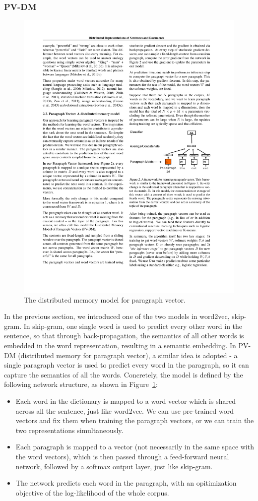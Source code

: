 \subsubsection{PV-DM}

\begin{figure}
\centering
\includegraphics[width=0.5\columnwidth]{figures/methods/PV-DM}
\caption{The distributed memory model for paragraph vector.}
\label{fig:methods:PV-DM}
\end{figure}

In the previous section, we introduced one of the two models in word2vec, skip-gram. In skip-gram, one single word is used to predict every other word in the sentence, so that through back-propagation, the semantics of all other words is embedded in the word representation, resulting in a semantic embedding. In PV-DM (distributed memory for paragraph vector), a similar idea is adopted - a single paragraph vector is used to predict every word in the paragraph, so it can capture the semantics of all the words. Concretely, the model is defined by the following network structure, as shown in Figure~\ref{fig:methods:PV-DM}:

\begin{itemize}
    \item Each word in the dictionary is mapped to a word vector which is shared across all the sentence, just like word2vec. We can use pre-trained word vectors and fix them when training the paragraph vectors, or we can train the two representations simultaneously.
    \item Each paragraph is mapped to a vector (not necessarily in the same space with the word vectors), which is then passed through a feed-forward neural network, followed by a softmax output layer, just like skip-gram.
    \item The network predicts each word in the paragraph, with an opitimization objective of the log-likelihood of the whole corpus.
\end{itemize}

